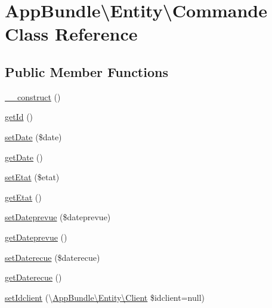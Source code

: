 \hypertarget{class_app_bundle_1_1_entity_1_1_commande}{}\section{App\+Bundle\textbackslash{}Entity\textbackslash{}Commande Class Reference}
\label{class_app_bundle_1_1_entity_1_1_commande}
\subsection*{Public Member Functions}
\begin{DoxyCompactItemize}
\item 
\hyperlink{class_app_bundle_1_1_entity_1_1_commande_a3236b821b3f0ef779ad7dc8485ed9fe1}{\+\_\+\+\_\+construct} ()
\item 
\hyperlink{class_app_bundle_1_1_entity_1_1_commande_a38c9a006beda317fc911059f42150b55}{get\+Id} ()
\item 
\hyperlink{class_app_bundle_1_1_entity_1_1_commande_ae87184a15b4dbf7e5be5fcd5e4af20ab}{set\+Date} (\$date)
\item 
\hyperlink{class_app_bundle_1_1_entity_1_1_commande_a04112a394394ccbf6c34f0b609d83f49}{get\+Date} ()
\item 
\hyperlink{class_app_bundle_1_1_entity_1_1_commande_abe8f50608638c791bb949720f2b7ef1a}{set\+Etat} (\$etat)
\item 
\hyperlink{class_app_bundle_1_1_entity_1_1_commande_acfb1b96cefd5d88deb402c28ea1ae7bd}{get\+Etat} ()
\item 
\hyperlink{class_app_bundle_1_1_entity_1_1_commande_a2df21c904c78ee7eae998aba3a7c1ab9}{set\+Dateprevue} (\$dateprevue)
\item 
\hyperlink{class_app_bundle_1_1_entity_1_1_commande_a630e1e196d6a666a56c5199747658952}{get\+Dateprevue} ()
\item 
\hyperlink{class_app_bundle_1_1_entity_1_1_commande_ad123fe4490903de722cb787ff6b5dc86}{set\+Daterecue} (\$daterecue)
\item 
\hyperlink{class_app_bundle_1_1_entity_1_1_commande_a6abf38123c315e9d6a7dbab9c18f125c}{get\+Daterecue} ()
\item 
\hyperlink{class_app_bundle_1_1_entity_1_1_commande_ab06e927d69aeb2c0c1d9dbf10ebd7182}{set\+Idclient} (\textbackslash{}\hyperlink{class_app_bundle_1_1_entity_1_1_client}{App\+Bundle\textbackslash{}\+Entity\textbackslash{}\+Client} \$idclient=null)
\item 

\end{DoxyCompactItemize}
